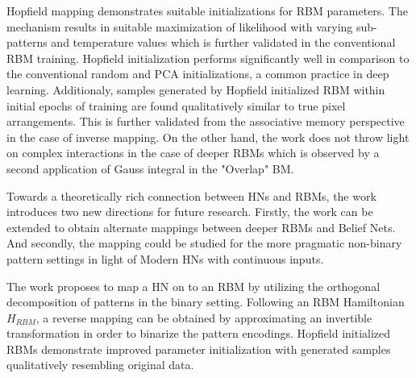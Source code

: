 \documentclass[11pt,letterpaper]{article}
\begin{document}
Hopfield mapping demonstrates suitable initializations for RBM parameters. The mechanism results in suitable maximization of likelihood with varying sub-patterns and temperature values which is further validated in the conventional RBM training. Hopfield initialization performs significantly well in comparison to the conventional random and PCA initializations, a common practice in deep learning. Additionaly, samples generated by Hopfield initialized RBM within initial epochs of training are found qualitatively similar to true pixel arrangements. This is further validated from the associative memory perspective in the case of inverse mapping. On the other hand, the work does not throw light on complex interactions in the case of deeper RBMs which is observed by a second application of Gauss integral in the "Overlap" BM. 

Towards a theoretically rich connection between HNs and RBMs, the work introduces two new directions for future research. Firstly, the work can be extended to obtain alternate mappings between deeper RBMs and Belief Nets. And secondly, the mapping could be studied for the more pragmatic non-binary pattern settings in light of Modern HNs with continuous inputs.

The work proposes to map a HN on to an RBM by utilizing the orthogonal decomposition of patterns in the binary setting. Following an RBM Hamiltonian $H_{RBM}$, a reverse mapping can be obtained by approximating an invertible transformation in order to binarize the pattern encodings. Hopfield initialized RBMs demonstrate improved parameter initialization with generated samples qualitatively resembling original data. 
\end{document}
